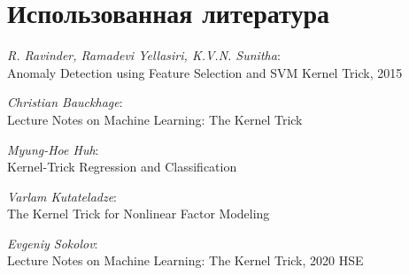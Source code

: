 \section{Использованная литература}
\item \textit{R. Ravinder, Ramadevi Yellasiri, K.V.N. Sunitha}: \\ Anomaly Detection using Feature Selection and SVM Kernel Trick, 2015
	\item \textit{Christian Bauckhage}: \\
	Lecture Notes on Machine Learning: The Kernel Trick
	\item \textit{Myung-Hoe Huh}: \\
	Kernel-Trick Regression and Classification
	\item \textit{Varlam Kutateladze}: \\
	The Kernel Trick for Nonlinear Factor Modeling 
	\item \textit{Evgeniy Sokolov}: \\
	Lecture Notes on Machine Learning: The Kernel Trick, 2020 HSE